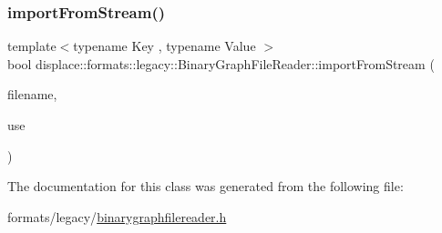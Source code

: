 \subsubsection{\texorpdfstring{importFromStream()}{importFromStream()}}
{\footnotesize\ttfamily template$<$typename Key , typename Value $>$ \\
bool displace\+::formats\+::legacy\+::\+Binary\+Graph\+File\+Reader\+::import\+From\+Stream (\begin{DoxyParamCaption}\item[{const std\+::string \&}]{filename,  }\item[{\mbox{\hyperlink{classdisplace_1_1formats_1_1legacy_1_1_binary_graph_file_reader_aa2ff0e1281c7a9d96e19c0b1f821161c}{Loader\+Function}}$<$ Key, Value $>$}]{use }\end{DoxyParamCaption})\hspace{0.3cm}{\ttfamily [inline]}}



The documentation for this class was generated from the following file\+:\begin{DoxyCompactItemize}
\item 
formats/legacy/\mbox{\hyperlink{binarygraphfilereader_8h}{binarygraphfilereader.\+h}}\end{DoxyCompactItemize}
